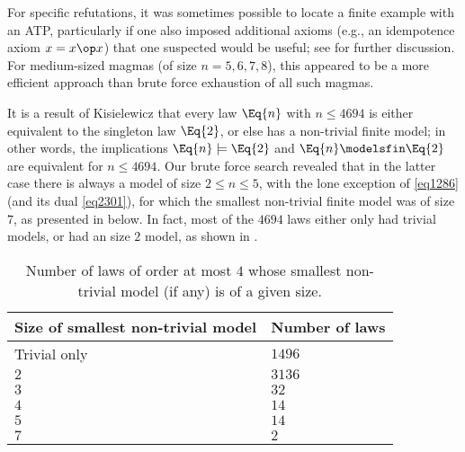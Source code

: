 For specific refutations, it was sometimes possible to locate a finite example with an ATP, particularly if one also imposed additional axioms (e.g., an idempotence axiom $x = x \op x$) that one suspected would be useful; see  for further discussion.  For medium-sized magmas (of size $n=5,6,7,8$), this appeared to be a more efficient approach than brute force exhaustion of all such magmas.

It is a result of Kisielewicz \cite{Kisielewicz} that every law $\Eq{n}$ with $n \leq 4694$ is either equivalent to the singleton law $\Eq{2}$, or else has a non-trivial finite model; in other words, the implications $\Eq{n} \models \Eq{2}$ and $\Eq{n} \modelsfin \Eq{2}$ are equivalent for $n \leq 4694$.  Our brute force search revealed that in the latter case there is always a model of size $2 \leq n \leq 5$, with the lone exception of \eqref{eq1286} (and its dual \eqref{eq2301}), for which the smallest non-trivial finite model was of size $7$, as presented in  below.  In fact, most of the $\num{4694}$ laws either only had trivial models, or had an size $2$ model, as shown in .
\begin{table}
\centering
\caption{Number of laws of order at most $4$ whose smallest non-trivial model (if any) is of a given size.}\label{size-table}
\begin{tabular}{ll}
  \hline
Size of smallest non-trivial model & Number of laws \\
\hline
Trivial only & $1496$ \\
$2$ & $3136$ \\
$3$ & $32$ \\
$4$ & $14$ \\
$5$ & $14$ \\
$7$ & $2$\\
\hline
\end{tabular}
\end{table}

